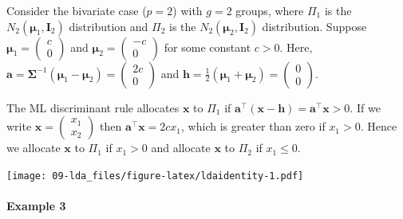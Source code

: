 \documentclass[
]{book}
\theoremstyle{definition}
\theoremstyle{definition}
\theoremstyle{definition}
\theoremstyle{definition}
\theoremstyle{remark}
\begin{document}
Consider the bivariate case (\(p=2\)) with \(g=2\) groups, where \(\Pi_1\) is the \(N_2({\boldsymbol{\mu}}_1,\mathbf I_2)\) distribution and \(\Pi_2\) is the \(N_2({\boldsymbol{\mu}}_2,\mathbf I_2)\) distribution. Suppose \({\boldsymbol{\mu}}_1 = \begin{pmatrix} c \\ 0 \end{pmatrix}\) and \({\boldsymbol{\mu}}_2 =  \begin{pmatrix} -c \\ 0 \end{pmatrix}\) for some constant \(c>0\). Here, \(\mathbf a= \boldsymbol{\Sigma}^{-1} ({\boldsymbol{\mu}}_1 - {\boldsymbol{\mu}}_2) = \begin{pmatrix} 2c \\ 0 \end{pmatrix}\) and \(\mathbf h= \frac{1}{2}( {\boldsymbol{\mu}}_1 + {\boldsymbol{\mu}}_2 ) = \begin{pmatrix} 0 \\ 0 \end{pmatrix}\).

The ML discriminant rule allocates \(\mathbf x\) to \(\Pi_1\) if \(\mathbf a^\top (\mathbf x- \mathbf h) = \mathbf a^\top \mathbf x> 0\). If we write \(\mathbf x= \begin{pmatrix} x_1 \\ x_2 \end{pmatrix}\) then \(\mathbf a^\top \mathbf x= 2cx_1\), which is greater than zero if \(x_1 > 0\). Hence we allocate \(\mathbf x\) to \(\Pi_1\) if \(x_1 > 0\) and allocate \(\mathbf x\) to \(\Pi_2\) if \(x_1 \leq 0\).

\texttt{[image: 09-lda\_files/figure-latex/ldaidentity-1.pdf]}

\paragraph*{Example 3}\label{example-3-1}
\end{document}
